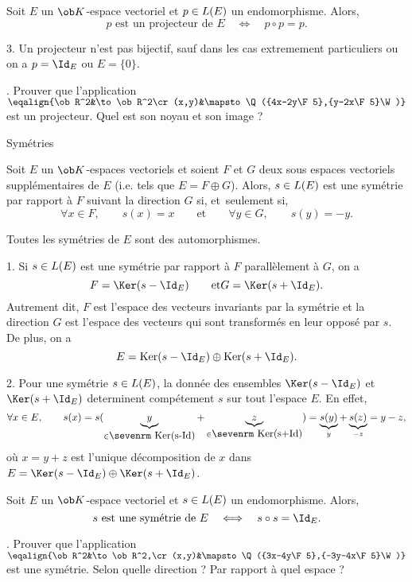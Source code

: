 \Propriete []  Soit $E$ un $\ob K$-espace vectoriel et $p\in\sc L(E)$ un endomorphisme. Alors, 
$$
{p\mbox{ est un projecteur de }E\quad \Longleftrightarrow\quad p\circ p=p}.
$$

\Remarque{} 3. Un projecteur n'est pas bijectif, sauf dans les cas extremement particuliers ou on a $p=\Id_E$ ou $E=\{0\}$. 
\bigskip

\Exercice. Prouver que l'application $\eqalign{\ob R^2&\to \ob R^2\cr (x,y)&\mapsto  \Q({4x-2y\F5},{y-2x\F5}\W)}$ est un projecteur. Quel est son noyau et son image ?
\bigskip

\Concept [] Symétries 

\noindent
Soit $E$ un $\ob K$-espaces vectoriels et soient $F$ et $G$ deux sous espaces vectoriels sup\-plé\-men\-tai\-res de $E$ (i.e. tels que $E=F\oplus G$). 
Alors, $s\in\sc L(E)$ est une symétrie par rapport à $F$ suivant la direction $G$ si, et~seulement si, 
$$
\forall x\in F ,\qquad  s(x)=x \qquad\mbox{et}\qquad\forall y\in G , \qquad  s(y)=-y .
$$

\Propriete []  Toutes les symétries de $E$ sont des automorphismes.
\bigskip

\Remarque{} 1. Si $s\in\sc L(E)$ est une symétrie par rapport à $F$ parallèlement à $G$, on a 
$$
F=\Ker(s-\Id_E) \qquad\mbox{et}  G=\Ker(s+\Id_E) . 
$$
Autrement dit, $F$ est l'espace des vecteurs invariants par la symétrie et la direction $G$ est l'espace des vecteurs qui sont transformés en leur opposé par $s$. De plus, on a 
$$
{E=\mbox{Ker}(s-\Id_E)\oplus\mbox{Ker}(s+\Id_E)}.
$$

\Remarque{} 2. Pour une symétrie $s\in\sc L(E)$, la donnée des ensembles $\Ker(s-\Id_E)$ et $\Ker(s+\Id_E)$ determinent compétement $s$ sur tout l'espace $E$. En effet, 
$$
\forall x\in E, \qquad s(x)=s(\underbrace{y}_{\in\mbox{\sevenrm Ker(s-Id)}}+\underbrace{z}_{\in\mbox{\sevenrm Ker(s+Id)}})=\underbrace{s(y)}_y+\underbrace{s(z)}_{-z}=y-z,
$$
où $x=y+z$ est l'unique décomposition de $x$ dans $E=\Ker(s-\Id_E)\oplus\Ker(s+\Id_E)$. 
\bigskip

\Propriete []  Soit $E$ un $\ob K$-espace vectoriel et $s\in\sc L(E)$ un endomorphisme. Alors, 
$$
{s\mbox{ est une symétrie de }E\quad \Longleftrightarrow\quad s\circ s=\Id_E}.
$$


\Exercice. Prouver que l'application $\eqalign{\ob R^2&\to \ob R^2,\cr(x,y)&\mapsto  \Q({3x-4y\F5},{-3y-4x\F5}\W)}$ est une symétrie. Selon quelle direction ? Par rapport à quel espace ?



